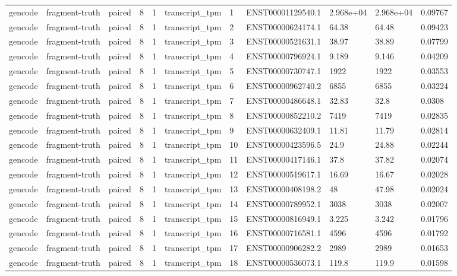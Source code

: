 \begin{tabular}{lllllllllll}
gencode & fragment-truth & paired & 8 & 1 & transcript\_tpm & 1 & ENST00001129540.1 & 2.968e+04 & 2.968e+04 & 0.09767 \\
gencode & fragment-truth & paired & 8 & 1 & transcript\_tpm & 2 & ENST00000624174.1 & 64.38 & 64.48 & 0.09423 \\
gencode & fragment-truth & paired & 8 & 1 & transcript\_tpm & 3 & ENST00000521631.1 & 38.97 & 38.89 & 0.07799 \\
gencode & fragment-truth & paired & 8 & 1 & transcript\_tpm & 4 & ENST00000796924.1 & 9.189 & 9.146 & 0.04209 \\
gencode & fragment-truth & paired & 8 & 1 & transcript\_tpm & 5 & ENST00000730747.1 & 1922 & 1922 & 0.03553 \\
gencode & fragment-truth & paired & 8 & 1 & transcript\_tpm & 6 & ENST00000962740.2 & 6855 & 6855 & 0.03224 \\
gencode & fragment-truth & paired & 8 & 1 & transcript\_tpm & 7 & ENST00000486648.1 & 32.83 & 32.8 & 0.0308 \\
gencode & fragment-truth & paired & 8 & 1 & transcript\_tpm & 8 & ENST00000852210.2 & 7419 & 7419 & 0.02835 \\
gencode & fragment-truth & paired & 8 & 1 & transcript\_tpm & 9 & ENST00000632409.1 & 11.81 & 11.79 & 0.02814 \\
gencode & fragment-truth & paired & 8 & 1 & transcript\_tpm & 10 & ENST00000423596.5 & 24.9 & 24.88 & 0.02244 \\
gencode & fragment-truth & paired & 8 & 1 & transcript\_tpm & 11 & ENST00000417146.1 & 37.8 & 37.82 & 0.02074 \\
gencode & fragment-truth & paired & 8 & 1 & transcript\_tpm & 12 & ENST00000519617.1 & 16.69 & 16.67 & 0.02028 \\
gencode & fragment-truth & paired & 8 & 1 & transcript\_tpm & 13 & ENST00000408198.2 & 48 & 47.98 & 0.02024 \\
gencode & fragment-truth & paired & 8 & 1 & transcript\_tpm & 14 & ENST00000789952.1 & 3038 & 3038 & 0.02007 \\
gencode & fragment-truth & paired & 8 & 1 & transcript\_tpm & 15 & ENST00000816949.1 & 3.225 & 3.242 & 0.01796 \\
gencode & fragment-truth & paired & 8 & 1 & transcript\_tpm & 16 & ENST00000716581.1 & 4596 & 4596 & 0.01792 \\
gencode & fragment-truth & paired & 8 & 1 & transcript\_tpm & 17 & ENST00000906282.2 & 2989 & 2989 & 0.01653 \\
gencode & fragment-truth & paired & 8 & 1 & transcript\_tpm & 18 & ENST00000536073.1 & 119.8 & 119.9 & 0.01598 \\

\end{tabular}
